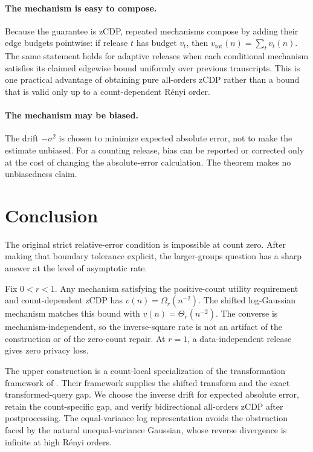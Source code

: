 \documentclass[11pt]{article}
\theoremstyle{definition}
\begin{document}
\paragraph{The mechanism is easy to compose.}
Because the guarantee is zCDP, repeated mechanisms compose by adding their edge budgets pointwise: if release $t$ has budget $v_t$, then $v_{\mathrm{tot}}(n)=\sum_t v_t(n)$. The same statement holds for adaptive releases when each conditional mechanism satisfies its claimed edgewise bound uniformly over previous transcripts. This is one practical advantage of obtaining pure all-orders zCDP rather than a bound that is valid only up to a count-dependent R\'enyi order.

\paragraph{The mechanism may be biased.}
The drift $-\sigma^2$ is chosen to minimize expected absolute error, not to make the estimate unbiased. For a counting release, bias can be reported or corrected only at the cost of changing the absolute-error calculation. The theorem makes no unbiasedness claim.

\section{Conclusion}

The original strict relative-error condition is impossible at count zero. After making that boundary tolerance explicit, the larger-groups question has a sharp answer at the level of asymptotic rate.

Fix $0<r<1$. Any mechanism satisfying the positive-count utility requirement and count-dependent zCDP has $v(n)=\Omega_r(n^{-2})$. The shifted log-Gaussian mechanism matches this bound with $v(n)=\Theta_r(n^{-2})$. The converse is mechanism-independent, so the inverse-square rate is not an artifact of the construction or of the zero-count repair. At $r=1$, a data-independent release gives zero privacy loss.

The upper construction is a count-local specialization of the transformation framework of \citet{FinleyEtAl2026}. Their framework supplies the shifted transform and the exact transformed-query gap. We choose the inverse drift for expected absolute error, retain the count-specific gap, and verify bidirectional all-orders zCDP after postprocessing. The equal-variance log representation avoids the obstruction faced by the natural unequal-variance Gaussian, whose reverse divergence is infinite at high R\'enyi orders.
\end{document}
